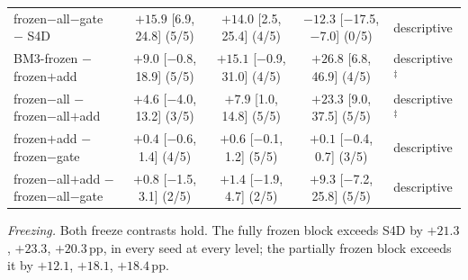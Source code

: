\begin{table}[htbp]
\begin{tabular}{@{}lcccl@{}}
\shortstack[l]{frozen$-$all$-$gate\\ $-$ S4D} & \shortstack{$+15.9$\\ {[}6.9, 24.8{]} (5/5)} & \shortstack{$+14.0$\\ {[}2.5, 25.4{]} (4/5)} & \shortstack{$-12.3$\\ {[}$-$17.5, $-$7.0{]} (0/5)} & descriptive \\[3pt]
\shortstack[l]{BM3-frozen\\ $-$ frozen$+$add} & \shortstack{$+9.0$\\ {[}$-$0.8, 18.9{]} (5/5)} & \shortstack{$+15.1$\\ {[}$-$0.9, 31.0{]} (4/5)} & \shortstack{$+26.8$\\ {[}6.8, 46.9{]} (4/5)} & descriptive$^{\ddagger}$ \\[3pt]
\shortstack[l]{frozen$-$all\\ $-$ frozen$-$all$+$add} & \shortstack{$+4.6$\\ {[}$-$4.0, 13.2{]} (3/5)} & \shortstack{$+7.9$\\ {[}1.0, 14.8{]} (5/5)} & \shortstack{$+23.3$\\ {[}9.0, 37.5{]} (5/5)} & descriptive$^{\ddagger}$ \\[3pt]
\shortstack[l]{frozen$+$add\\ $-$ frozen$-$gate} & \shortstack{$+0.4$\\ {[}$-$0.6, 1.4{]} (4/5)} & \shortstack{$+0.6$\\ {[}$-$0.1, 1.2{]} (5/5)} & \shortstack{$+0.1$\\ {[}$-$0.4, 0.7{]} (3/5)} & descriptive \\[3pt]
\shortstack[l]{frozen$-$all$+$add\\ $-$ frozen$-$all$-$gate} & \shortstack{$+0.8$\\ {[}$-$1.5, 3.1{]} (2/5)} & \shortstack{$+1.4$\\ {[}$-$1.9, 4.7{]} (2/5)} & \shortstack{$+9.3$\\ {[}$-$7.2, 25.8{]} (5/5)} & descriptive \\[3pt]
\bottomrule
\end{tabular}
\end{table}

\emph{Freezing.} Both freeze contrasts hold. The fully frozen block exceeds S4D by $+21.3$, $+23.3$, $+20.3$\,pp, in every seed at every level; the partially frozen block exceeds it by $+12.1$, $+18.1$, $+18.4$\,pp.

